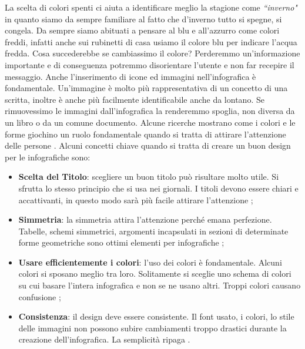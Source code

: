 La scelta di colori spenti ci aiuta a identificare meglio la stagione come \textit{``inverno"} in quanto siamo da sempre familiare al fatto che d'inverno tutto si spegne, si congela. Da sempre siamo abituati a pensare al blu e all'azzurro come colori freddi, infatti anche sui rubinetti di casa usiamo il colore blu per indicare l'acqua fredda.
Cosa succederebbe se cambiassimo il colore? Perderemmo un'informazione importante e di conseguenza potremmo disorientare l'utente e non far recepire il messaggio.\newline
Anche l'inserimento di icone ed immagini nell'infografica è fondamentale.\newline
Un'immagine è molto più rappresentativa di un concetto di una scritta, inoltre è anche più facilmente identificabile anche da lontano. Se rimuovessimo le immagini dall'infografica la renderemmo spoglia, non diversa da un libro o da un comune documento.
Alcune ricerche mostrano come i colori e le forme giochino un ruolo fondamentale quando si tratta di attirare l'attenzione delle persone \cite{facebook}.\newline
Alcuni concetti chiave quando si tratta di creare un buon design per le infografiche sono:
\begin{itemize}
    \item \textbf{Scelta del Titolo}: scegliere un buon titolo può risultare molto utile. Si sfrutta lo stesso principio che si usa nei giornali. I titoli devono essere chiari e accattivanti, in questo modo sarà più facile attirare l'attenzione \cite{venngage};
    \item \textbf{Simmetria}: la simmetria attira l'attenzione perché emana perfezione. Tabelle, schemi simmetrici, argomenti incapsulati in sezioni di determinate forme geometriche sono ottimi elementi per infografiche \cite{venngage};
    \item \textbf{Usare efficientemente i colori}: l'uso dei colori è fondamentale. Alcuni colori si sposano meglio tra loro. Solitamente si sceglie uno schema di colori su cui basare l'intera infografica e non se ne usano altri. Troppi colori causano confusione \cite{venngage};
    \item \textbf{Consistenza}: il design deve essere consistente. Il font usato, i colori, lo stile delle immagini non possono subire cambiamenti troppo drastici durante la creazione dell'infografica. La semplicità ripaga \cite{venngage}.
\end{itemize}
